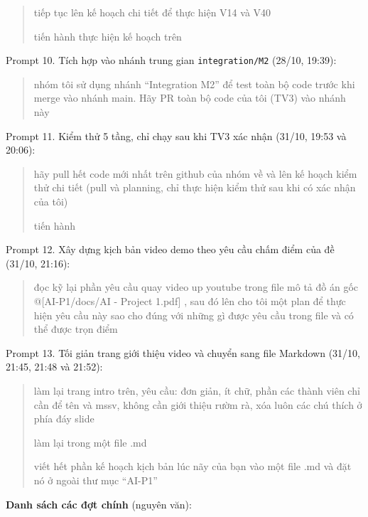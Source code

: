 \begin{quote}
tiếp tục lên kế hoạch chi tiết để thực hiện V14 và V40

tiến hành thực hiện kế hoạch trên
\end{quote}

Prompt 10. Tích hợp vào nhánh trung gian \texttt{integration/\allowbreak{}M2} (28/10, 19:39):

\begin{quote}
nhóm tôi sử dụng nhánh ``Integration M2'' để test toàn bộ code trước khi merge vào nhánh main. Hãy PR toàn bộ code của tôi (TV3) vào nhánh này
\end{quote}

Prompt 11. Kiểm thử 5 tầng, chỉ chạy sau khi TV3 xác nhận (31/10, 19:53 và 20:06):

\begin{quote}
hãy pull hết code mới nhất trên github của nhóm về và lên kế hoạch kiểm thử chi tiết (pull và planning, chỉ thực hiện kiểm thử sau khi có xác nhận của tôi)

tiến hành
\end{quote}

Prompt 12. Xây dựng kịch bản video demo theo yêu cầu chấm điểm của đề (31/10, 21:16):

\begin{quote}
đọc kỹ lại phần yêu cầu quay video up youtube trong file mô tả đồ án gốc @{[}AI-P1/docs/AI - Project 1.pdf{]} , sau đó lên cho tôi một plan để thực hiện yêu cầu này sao cho đúng với những gì được yêu cầu trong file và có thể được trọn điểm
\end{quote}

Prompt 13. Tối giản trang giới thiệu video và chuyển sang file Markdown (31/10, 21:45, 21:48 và 21:52):

\begin{quote}
làm lại trang intro trên, yêu cầu: đơn giản, ít chữ, phần các thành viên chỉ cần để tên và mssv, không cần giới thiệu rườm rà, xóa luôn các chú thích ở phía đáy slide

làm lại trong một file .md

viết hết phần kế hoạch kịch bản lúc nãy của bạn vào một file .md và đặt nó ở ngoài thư mục ``AI-P1''
\end{quote}

\textbf{Danh sách các đợt chính} (nguyên văn):



